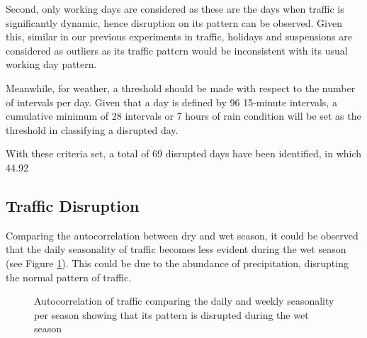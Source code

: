 Second, only working days are considered as these are the days when traffic is significantly dynamic, hence disruption on its pattern can be observed. Given this, similar in our previous experiments in traffic, holidays and suspensions are considered as outliers as its traffic pattern would be inconsistent with its usual working day pattern.

Meanwhile, for weather, a threshold should be made with respect to the number of intervals per day. Given that a day is defined by 96 15-minute intervals, a cumulative minimum of 28 intervals or 7 hours of rain condition will be set as the threshold in classifying a disrupted day.

With these criteria set, a total of 69 disrupted days have been identified, in which 44.92%

\subsection{Traffic Disruption}
Comparing the autocorrelation between dry and wet season, it could be observed that the daily seasonality of traffic becomes less evident during the wet season (see Figure \ref{figure_autocorr_traffic_season}). This could be due to the abundance of precipitation, disrupting the normal pattern of traffic.


\begin{figure}[h] 
\centering
    \centering
      \captionsetup{justification=centering}
    \hfill
    \caption{Autocorrelation of traffic comparing the daily and weekly seasonality per season showing that its pattern is disrupted during the wet season}
    \label{figure_autocorr_traffic_season}
\end{figure}


